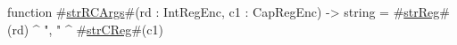 function #\hyperref[sailMIPSzstrRCArgs]{strRCArgs}#(rd : IntRegEnc, c1 : CapRegEnc) -> string = #\hyperref[sailMIPSzstrReg]{strReg}#(rd) ^ ", " ^ #\hyperref[sailMIPSzstrCReg]{strCReg}#(c1)
